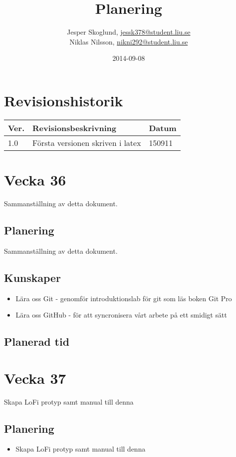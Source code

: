 \documentclass{TDP003mall}
\author{Jesper Skoglund, \url{jessk378@student.liu.se}\\
  Niklas Nilsson, \url{nikni292@student.liu.se}}
\title{Planering}
\date{2014-09-08}
\begin{document}
\projectpage
\section{Revisionshistorik}
\begin{table}[!h]
\begin{tabularx}{\linewidth}{|l|X|l|}
\hline
Ver. & Revisionsbeskrivning & Datum \\\hline
1.0 & Första versionen skriven i latex & 150911 \\\hline
\end{tabularx}
\end{table}


\section{Vecka 36}
Sammanställning av detta dokument. \\

\subsection{Planering}
Sammanställning av detta dokument.

\subsection{Kunskaper}

\begin{itemize}
\item Lära oss Git - genomför introduktionslab för git som läs boken Git Pro
\item Lära oss GitHub - för att syncronisera vårt arbete på ett smidigt sätt
\end{itemize}
  
\subsection{Planerad tid}


\section{Vecka 37}
Skapa LoFi protyp samt manual till denna

\subsection{Planering}
\begin{itemize}
\item Skapa LoFi protyp samt manual till denna
\end{itemize}
\end{document}
